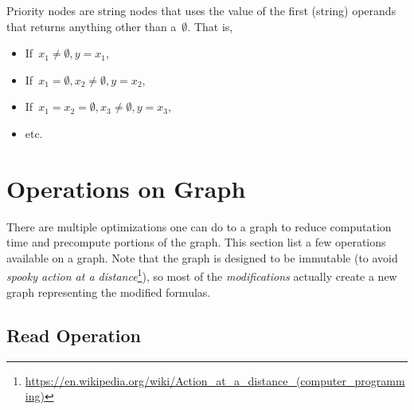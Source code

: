 \documentclass{article}
\begin{document}
Priority nodes are string nodes that uses the value of the first (string) operands that returns anything other than a~$\emptyset$.
That is,

\begin{itemize}
	\item If~$x_1 \neq \emptyset, y = x_1$,
	\item If~$x_1 = \emptyset, x_2\neq\emptyset, y = x_2$,
	\item If~$x_1 = x_2 = \emptyset, x_3\neq\emptyset, y = x_3$,
	\item etc.
\end{itemize}

\section{Operations on Graph}

There are multiple optimizations one can do to a graph to reduce computation time and precompute portions of the graph.
This section list a few operations available on a graph.
Note that the graph is designed to be immutable (to avoid \emph{spooky action at a distance}\footnote{
	\url{https://en.wikipedia.org/wiki/Action_at_a_distance_(computer_programming)}
}), so most of the \emph{modifications} actually create a new graph representing the modified formulas.

\subsection{Read Operation}
\label{sec:operation:read}
\end{document}
